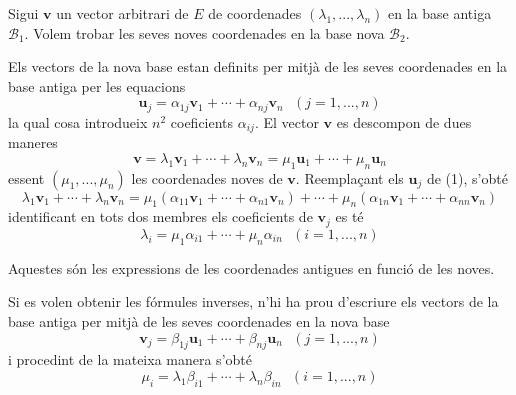\begin{prova}
Sigui $\mathbf{v}$ un vector arbitrari de $E$ de coordenades $%
(\lambda _{1},...,\lambda _{n})$ en la base antiga $\mathcal{B}_{1}$.
Volem trobar les seves noves coordenades en la base nova $\mathcal{B}_{2}$.

Els vectors de la nova base estan definits per mitjà de les seves
coordenades en la base antiga per les equacions 
\begin{equation}
\mathbf{u}_{j}=\alpha _{1j}\mathbf{v}_{1}+\cdots +\alpha _{nj}\mathbf{v}_{n}%
\text{ \ \ \ }(j=1,...,n)  \label{1}
\end{equation}%
la qual cosa introdueix $n^{2}$ coeficients $\alpha _{ij}$. El vector $\mathbf{v}$
es descompon de dues maneres 
\begin{equation*}
\mathbf{v}=\lambda _{1}\mathbf{v}_{1}+\cdots +\lambda _{n}\mathbf{v}_{n}=\mu
_{1}\mathbf{u}_{1}+\cdots +\mu _{n}\mathbf{u}_{n}
\end{equation*}%
essent $(\mu _{1},...,\mu _{n})$ les coordenades noves de $\mathbf{v}$.
Reemplaçant els $\mathbf{u}_{j}$ de (1), s’obté 
\begin{equation*}
\lambda _{1}\mathbf{v}_{1}+\cdots +\lambda _{n}\mathbf{v}_{n}=\mu
_{1}(\alpha _{11}\mathbf{v}_{1}+\cdots +\alpha _{n1}\mathbf{v}_{n})+\cdots
+\mu _{n}(\alpha _{1n}\mathbf{v}_{1}+\cdots +\alpha _{nn}\mathbf{v}_{n})
\end{equation*}%
identificant en tots dos membres els coeficients de $\mathbf{v}_{j}$ es
té 
\begin{equation*}
\lambda _{i}=\mu _{1}\alpha _{i1}+\cdots +\mu _{n}\alpha _{in}\text{ \ \ }%
(i=1,...,n)
\end{equation*}

Aquestes són les expressions de les coordenades antigues en funció de les
noves.

Si es volen obtenir les fórmules inverses, n’hi ha prou d’escriure els vectors
de la base antiga per mitjà de les seves coordenades en la nova base%
\begin{equation}
\mathbf{v}_{j}=\beta _{1j}\mathbf{u}_{1}+\cdots +\beta _{nj}\mathbf{u}_{n}%
\text{ \ \ }(j=1,...,n)  \label{2}
\end{equation}%
i procedint de la mateixa manera s’obté 
\begin{equation*}
\mu _{i}=\lambda _{1}\beta _{i1}+\cdots +\lambda _{n}\beta _{in}\text{ \ \ }%
(i=1,...,n)
\end{equation*}
\end{prova}


